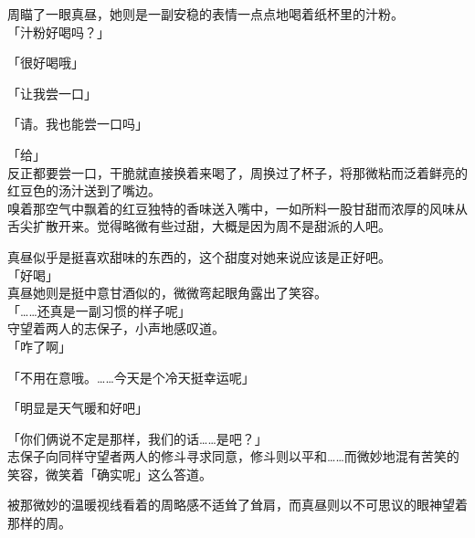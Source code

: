 周瞄了一眼真昼，她则是一副安稳的表情一点点地喝着纸杯里的汁粉。\\

「汁粉好喝吗？」

「很好喝哦」

「让我尝一口」

「请。我也能尝一口吗」

「给」\\

反正都要尝一口，干脆就直接换着来喝了，周换过了杯子，将那微粘而泛着鲜亮的红豆色的汤汁送到了嘴边。\\

嗅着那空气中飘着的红豆独特的香味送入嘴中，一如所料一股甘甜而浓厚的风味从舌尖扩散开来。觉得略微有些过甜，大概是因为周不是甜派的人吧。

真昼似乎是挺喜欢甜味的东西的，这个甜度对她来说应该是正好吧。\\

「好喝」\\

真昼她则是挺中意甘酒似的，微微弯起眼角露出了笑容。\\

「……还真是一副习惯的样子呢」\\

守望着两人的志保子，小声地感叹道。\\

「咋了啊」

「不用在意哦。……今天是个冷天挺幸运呢」

「明显是天气暖和好吧」

「你们俩说不定是那样，我们的话……是吧？」\\

志保子向同样守望者两人的修斗寻求同意，修斗则以平和……而微妙地混有苦笑的笑容，微笑着「确实呢」这么答道。

被那微妙的温暖视线看着的周略感不适耸了耸肩，而真昼则以不可思议的眼神望着那样的周。
